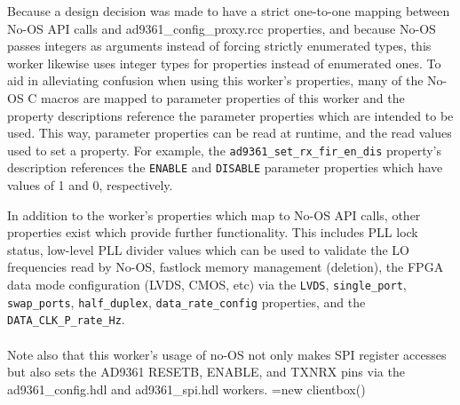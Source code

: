 \documentclass{article}
\def\comp{ad9361\_config\_proxy}
\begin{document}
\begin{sloppypar}
\noindent
Because a design decision was made to have a strict one-to-one mapping between No-OS API calls and \comp{}.rcc properties, and because No-OS passes integers as arguments instead of forcing strictly enumerated types, this worker likewise uses integer types for properties instead of enumerated ones. To aid in alleviating confusion when using this worker's properties, many of the No-OS C macros are mapped to parameter properties of this worker and the property descriptions reference the parameter properties which are intended to be used. This way, parameter properties can be read at runtime, and the read values used to set a property. For example, the \verb+ad9361_set_rx_fir_en_dis+ property's description references the \verb+ENABLE+ and \verb+DISABLE+ parameter properties which have values of 1 and 0, respectively. \\
\end{sloppypar}
In addition to the worker's properties which map to No-OS API calls, other properties exist which provide further functionality. This includes PLL lock status, low-level PLL divider values which can be used to validate the LO frequencies read by No-OS, fastlock memory management (deletion), the FPGA data mode configuration (LVDS, CMOS, etc) via the \verb+LVDS+, \verb+single_port+, \verb+swap_ports+, \verb+half_duplex+, \verb+data_rate_config+ properties, and the \verb+DATA_CLK_P_rate_Hz+.\\ \\
Note also that this worker's usage of no-OS not only makes SPI register accesses but also sets the AD9361 RESETB, ENABLE, and TXNRX pins via the ad9361\_config.hdl\cite{config_comp_datasheet} and ad9361\_spi.hdl\cite{spi_comp_datasheet} workers.
\makeatletter
\newcommand{\gettikzxy}[3]{%
  \tikz@scan@one@point\pgfutil@firstofone#1\relax
  \edef#2{\the\pgf@x}%
  \edef#3{\the\pgf@y}%
}
\makeatother
{}
\pgfoonew \myclient=new clientbox()
\end{document}
